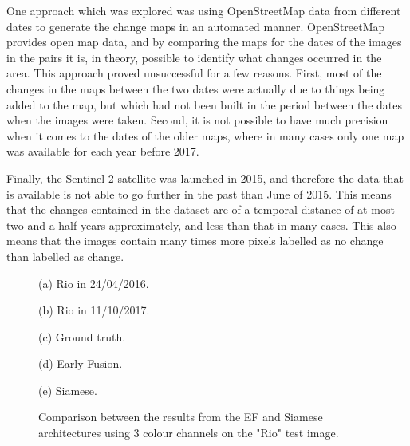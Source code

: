 \documentclass{article}
\begin{document}
One approach which was explored was using OpenStreetMap data from different dates to generate the change maps in an automated manner. OpenStreetMap provides open map data, and by comparing the maps for the dates of the images in the pairs it is, in theory, possible to identify what changes occurred in the area. This approach proved unsuccessful for a few reasons. First, most of the changes  in the maps between the two dates were actually due to things being added to the map, but which had not been built in the period between the dates when the images were taken. Second, it is not possible to have much precision when it comes to the dates of the older maps, where in many cases only one map was available for each year before 2017.

Finally, the Sentinel-2 satellite was launched in 2015, and therefore the data that is available is not able to go further in the past than June of 2015. This means that the changes contained in the dataset are of a temporal distance of at most two and a half years approximately, and less than that in many cases. This also means that the images contain many times more pixels labelled as no change than labelled as change.




\begin{figure*}[ht]

  \begin{minipage}[b]{0.18\linewidth}
    \centering
    \centerline{}
    \centerline{(a) Rio in 24/04/2016.}\medskip
  \end{minipage}
  \hfill
  \begin{minipage}[b]{0.18\linewidth}
    \centering
    \centerline{}
    \centerline{(b) Rio in 11/10/2017.}\medskip
  \end{minipage}
  \hfill
  \begin{minipage}[b]{0.18\linewidth}
    \centering
    \centerline{}
    \centerline{(c) Ground truth.}\medskip
  \end{minipage}
  \hfill
  \begin{minipage}[b]{0.18\linewidth}
    \centering
    \centerline{}
    \centerline{(d) Early Fusion.}\medskip
  \end{minipage}
  \hfill
  \begin{minipage}[b]{0.18\linewidth}
    \centering
    \centerline{}
    \centerline{(e) Siamese.}\medskip
  \end{minipage}
  
  \caption{Comparison between the results from the EF and Siamese architectures using 3 colour channels on the "Rio" test image.}
  \label{fig:arch_comp}
\end{figure*}
\end{document}
